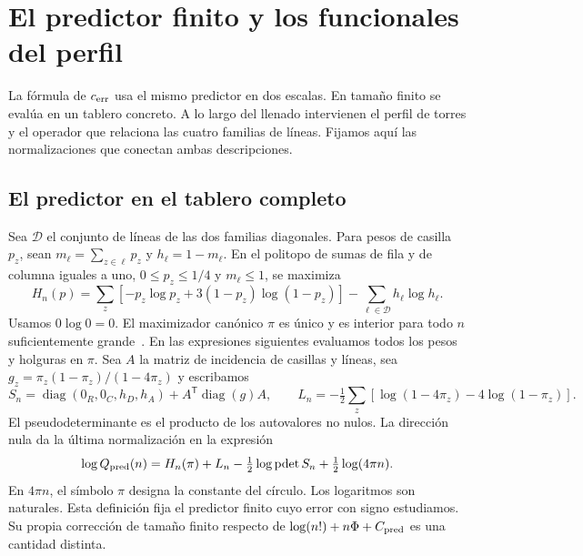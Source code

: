 \section{El predictor finito y los funcionales del perfil}\label{app:predictor}
La fórmula de \(c_{\mathrm{err}}\) usa el mismo predictor en dos escalas. En tamaño finito se evalúa en un tablero
concreto. A lo largo del llenado intervienen el perfil de torres y el operador que relaciona las
cuatro familias de líneas. Fijamos aquí las normalizaciones que conectan ambas descripciones.

\subsection{El predictor en el tablero completo}
Sea $\mathcal D$ el conjunto de líneas de las dos familias diagonales. Para pesos de casilla
$p_z$, sean $m_\ell=\sum_{z\in\ell}p_z$ y $h_\ell=1-m_\ell$. En el politopo de sumas de fila y de
columna iguales a uno, $0\le p_z\le1/4$ y $m_\ell\le1$, se maximiza
\[
 H_n(p)=\sum_z[-p_z\log p_z+3(1-p_z)\log(1-p_z)]
            -\sum_{\ell\in\mathcal D} h_\ell\log h_\ell .
\]
Usamos $0\log0=0$. El maximizador canónico $\pi$ es único y es interior para todo $n$
suficientemente grande~\cite[\S3 y (P2.7)]{pc}. En las expresiones siguientes evaluamos todos los
pesos y holguras en $\pi$. Sea $A$ la matriz de incidencia de casillas y líneas, sea
$g_z=\pi_z(1-\pi_z)/(1-4\pi_z)$ y escribamos
\[
 S_n=\operatorname{diag}(0_R,0_C,h_D,h_A)+A^{\mathsf T}\operatorname{diag}(g)A,\qquad
 L_n=-\tfrac12\sum_z[\log(1-4\pi_z)-4\log(1-\pi_z)].
\]
El pseudodeterminante es el producto de los autovalores no nulos. La dirección nula da la última
normalización en la expresión
\[
 \log Q_{\rm pred}(n)=H_n(\pi)+L_n-\tfrac12\log\operatorname{pdet} S_n
                      +\tfrac12\log(4\pi n).
\]
En $4\pi n$, el símbolo $\pi$ designa la constante del círculo. Los logaritmos son naturales.
Esta definición fija el predictor finito cuyo error con signo estudiamos. Su propia corrección
de tamaño finito respecto de $\log(n!)+n\Phi+C_{\rm pred}$ es una cantidad distinta.



